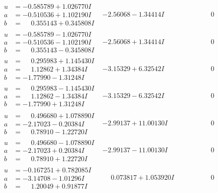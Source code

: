 \documentclass[1p]{elsarticle_modified}
\theoremstyle{definition}
\begin{document}
$$\begin{array}{c|c|c}
\begin{aligned}
u &= -0.585789 + 1.026770 I \\
a &= -0.510536 + 1.102190 I \\
b &= \phantom{-}0.355143 + 0.345808 I\end{aligned}
 & -2.56068 - 1.34414 I & \phantom{-0.000000 } 0 \\ \hline\begin{aligned}
u &= -0.585789 - 1.026770 I \\
a &= -0.510536 - 1.102190 I \\
b &= \phantom{-}0.355143 - 0.345808 I\end{aligned}
 & -2.56068 + 1.34414 I & \phantom{-0.000000 } 0 \\ \hline\begin{aligned}
u &= \phantom{-}0.295983 + 1.145430 I \\
a &= \phantom{-}1.12862 + 1.34384 I \\
b &= -1.77990 - 1.31248 I\end{aligned}
 & -3.15329 + 6.32542 I & \phantom{-0.000000 } 0 \\ \hline\begin{aligned}
u &= \phantom{-}0.295983 - 1.145430 I \\
a &= \phantom{-}1.12862 - 1.34384 I \\
b &= -1.77990 + 1.31248 I\end{aligned}
 & -3.15329 - 6.32542 I & \phantom{-0.000000 } 0 \\ \hline\begin{aligned}
u &= \phantom{-}0.496680 + 1.078890 I \\
a &= -2.17023 - 0.20384 I \\
b &= \phantom{-}0.78910 - 1.22720 I\end{aligned}
 & -2.99137 + 11.00130 I & \phantom{-0.000000 } 0 \\ \hline\begin{aligned}
u &= \phantom{-}0.496680 - 1.078890 I \\
a &= -2.17023 + 0.20384 I \\
b &= \phantom{-}0.78910 + 1.22720 I\end{aligned}
 & -2.99137 - 11.00130 I & \phantom{-0.000000 } 0 \\ \hline\begin{aligned}
u &= -0.167251 + 0.782085 I \\
a &= -3.14708 - 1.01296 I \\
b &= \phantom{-}1.20049 + 0.91877 I\end{aligned}
 & \phantom{-}0.073817 + 1.053920 I & \phantom{-0.000000 } 0 \\ \hline\begin{aligned}

\end{aligned}
\end{array}$$
\end{document}
